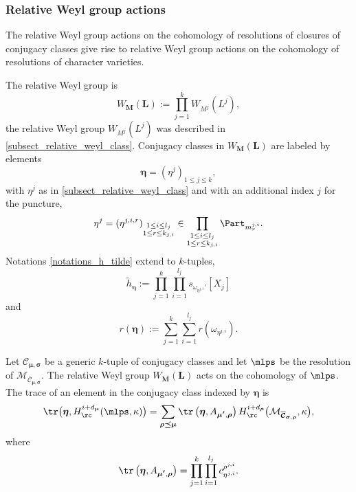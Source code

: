 \subsubsection{Relative Weyl group actions}\label{subsect_relative_weyl_char}

The relative Weyl group actions on the cohomology of resolutions of closures of conjugacy classes give rise to relative Weyl group actions on the cohomology of resolutions of character varieties.

\begin{notations}\label{notations_k_h_tilde}
The relative Weyl group is
\[
W_{\boldsymbol{M}}\left(\boldsymbol{L}\right):=\prod_{j=1}^k W_{M^j}(L^j),
\]
the relative Weyl group $W_{M^j}(L^j)$ was described in \ref{subsect_relative_weyl_class}.
Conjugacy classes in $W_{\boldsymbol{M}}(\boldsymbol{L})$ are labeled by elements
\[
\boldsymbol{\eta} = (\eta^j)_{1\le j\le k},
\]
with $\eta^j $
as in \ref{subsect_relative_weyl_class} and with an additional index $j$ for the puncture,
\[
\eta^j =(\eta^{j,i,r})_{\substack{ 1 \le i \le l_j\\ 1 \le r \le k_{j,i}}} \in \prod_{\substack{ 1 \le i \le l_j \\ 1 \le r \le k_{j,i}}} \Part_{m^{j,i}_{r}}.
\]
Notations \ref{notations_h_tilde} extend to $k$-tuples,
\[
\widetilde{h}_{\boldsymbol{\eta}}:=\prod_{j=1}^k\prod_{i=1}^{l_j} s_{ {\omega_{\eta^{j,i}}}' }\left[ X_j\right]
\]
and
\[
r(\boldsymbol{\eta}):=\sum_{j=1}^k\sum_{i=1}^{l_j} r(\omega_{\eta^{j,i}}).
\]
\end{notations}

\begin{theorem}\label{th_tr_resol}
Let $\mathcal{C}_{\boldsymbol{\mu},\boldsymbol{\sigma}}$ be a generic $k$-tuple of conjugacy classes and let $\mlps$ be the resolution of $\mathcal{M}_{\overline{\mathcal{C}}_{\boldsymbol{\mu},\boldsymbol{\sigma}}}$. The relative Weyl group $W_{\boldsymbol{M}}(\boldsymbol{L})$ acts on the cohomology of $\mlps$. The trace of an element in the conjugacy class indexed by $\boldsymbol{\eta}$ is
\[
\tr\bigl(\boldsymbol{\eta}, H_\rc^{i+d_{\boldsymbol{\mu}}}(\mlps,\kappa)\bigr) = \sum_{\boldsymbol{\rho\preceq \mu}} \tr\left(\boldsymbol{\eta}, A_{\boldsymbol{\mu'},\boldsymbol{\rho}}\right) H_\rc^{i+d_{\boldsymbol{\rho}}}\bigl(\mathcal{M}_{\overline{\boldsymbol{\mathcal{C}}}_{\boldsymbol{\sigma},\boldsymbol{\rho}}},\kappa\bigr),
\]
where
\[
\tr\left(\boldsymbol{\eta}, A_{\boldsymbol{\mu'},\boldsymbol{\rho}}\right) = \prod_{j=1}^k\prod_{i=1}^{l_j} c^{\rho^{j,i}}_{\eta^{j,i}}.
\]
\end{theorem}

